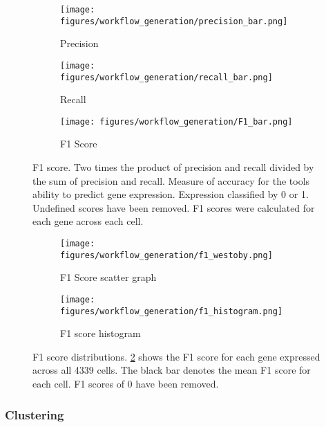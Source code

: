 \begin{figure}[h]
\centering
\begin{subfigure}{0.32\textwidth}
    \texttt{[image: figures/workflow\_generation/precision\_bar.png]}
    \caption{Precision}
\end{subfigure}
\begin{subfigure}{0.32\textwidth}
    \texttt{[image: figures/workflow\_generation/recall\_bar.png]}
    \caption{Recall}
\end{subfigure}
\begin{subfigure}{0.32\textwidth}
    \centering
    \texttt{[image: figures/workflow\_generation/F1\_bar.png]}
    \caption{F1 Score}
\end{subfigure}
\caption[F1, Precision and Recall Bar Charts]{F1 score.
Two times the product of precision and recall divided by the sum of precision and recall.
Measure of accuracy for the tools ability to predict gene expression.
Expression classified by 0 or 1.
Undefined scores have been removed.
F1 scores were calculated for each gene across each cell.}
\label{fig:precision_recall_f1_bar}
\end{figure}
%
\begin{figure}[h]
\begin{subfigure}{0.5\textwidth}
    \texttt{[image: figures/workflow\_generation/f1\_westoby.png]}
    \caption{F1 Score scatter graph}
    \label{fig:f1_westoby}
\end{subfigure}
\begin{subfigure}{0.5\textwidth}
    \texttt{[image: figures/workflow\_generation/f1\_histogram.png]}
    \caption{F1 score histogram}
    \label{fig:f1_hist}
\end{subfigure}
\caption[Distribution of F1 scores]{F1 score distributions.
    \ref{fig:f1_westoby} shows the F1 score for each gene expressed across all 4339 cells.
    The black bar denotes the mean F1 score for each cell.
    F1 scores of 0 have been removed.}
\label{fig:westoby_histogram}
\end{figure}

\subsubsection{Clustering}

